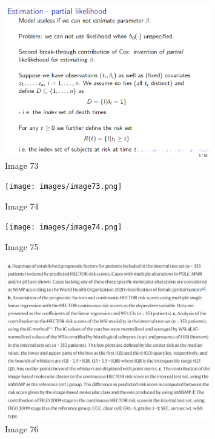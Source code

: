 \documentclass{article}%
\begin{document}
%


\begin{figure}[h!]%
\centering%
\includegraphics[width=0.8\textwidth]{images/image72.png}%
\caption{Image 73}%
\end{figure}

%


\begin{figure}[h!]%
\centering%
\texttt{[image: images/image73.png]}%
\caption{Image 74}%
\end{figure}

%


\begin{figure}[h!]%
\centering%
\texttt{[image: images/image74.png]}%
\caption{Image 75}%
\end{figure}

%


\begin{figure}[h!]%
\centering%
\includegraphics[width=0.8\textwidth]{images/image75.png}%
\caption{Image 76}%
\end{figure}
\end{document}
